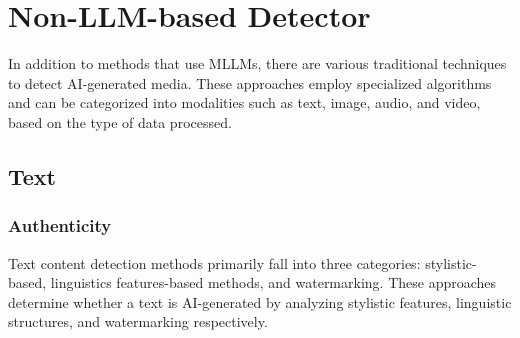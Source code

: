 \section{Non-LLM-based Detector}
\label{sec:non-mllm}

In addition to methods that use MLLMs, there are various traditional techniques to detect AI-generated media. These approaches employ specialized algorithms and can be categorized into modalities such as text, image, audio, and video, based on the type of data processed.


\subsection{Text}
\subsubsection{\textbf{Authenticity}}
Text content detection methods primarily fall into three categories: stylistic-based, linguistics features-based methods, and watermarking. These approaches determine whether a text is AI-generated by analyzing stylistic features, linguistic structures, and watermarking respectively.
